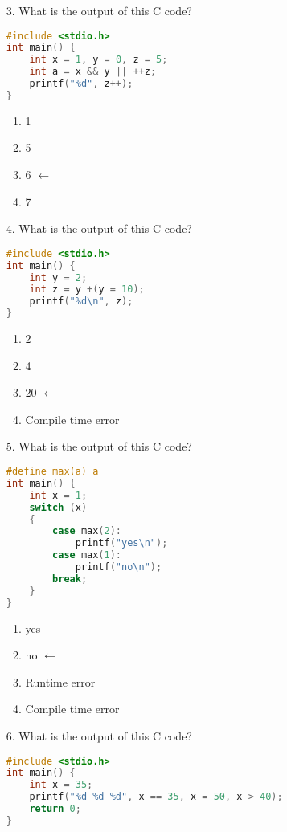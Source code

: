 \documentclass[letterpaper, 12pt]{article}
\begin{document}
\begin{itemize}
	\item[3.] What is the output of this C code?

\begin{lstlisting}[language=C, style=c]
#include <stdio.h>
int main() {
	int x = 1, y = 0, z = 5;
	int a = x && y || ++z;
	printf("%d", z++);
}
\end{lstlisting}

	\begin{enumerate}[label=(\alph*)]
		\item 1
		\item 5
		\item 6	$\leftarrow$
		\item 7
	\end{enumerate}

	\item[4.] What is the output of this C code?

\begin{lstlisting}[language=C, style=c]
#include <stdio.h>
int main() {
	int y = 2;
	int z = y +(y = 10);
	printf("%d\n", z);
}
\end{lstlisting}

	\begin{enumerate}[label=(\alph*)]
		\item 2
		\item 4
		\item 20	$\leftarrow$
		\item Compile time error
	\end{enumerate}

	\item[5.] What is the output of this C code?

\begin{lstlisting}[language=C, style=c]
#define max(a) a
int main() {
	int x = 1;
	switch (x)
	{
		case max(2):
			printf("yes\n");
		case max(1):
			printf("no\n");
		break;
	}
}
\end{lstlisting}

	\begin{enumerate}[label=(\alph*)]
		\item yes
		\item no $\leftarrow$
		\item Runtime error
		\item Compile time error
	\end{enumerate}

	\item[6.] What is the output of this C code?

\begin{lstlisting}[language=C, style=c]
#include <stdio.h>
int main() {
	int x = 35;
	printf("%d %d %d", x == 35, x = 50, x > 40);
	return 0;
}
\end{lstlisting}


\end{itemize}
\end{document}
